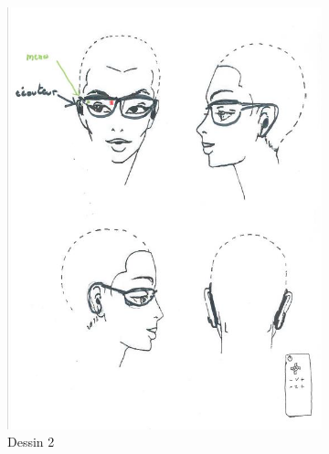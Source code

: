 \begin{figure}
\begin{subfigure}{0.32\textwidth}
\includegraphics[width=\columnwidth]{figures/gestes/dessincasque2.png}%
\caption{Dessin 2}
\end{subfigure}
\begin{subfigure}{0.32\textwidth}

\end{subfigure}
\end{figure}
